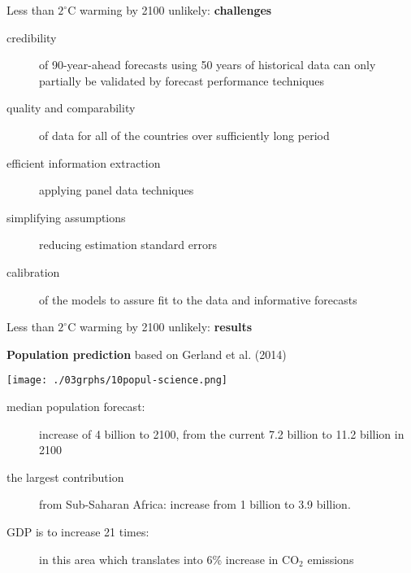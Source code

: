 \documentclass[notes,blackandwhite,mathsans,usenames,dvipsnames]{beamer}
\begin{document}
\begin{frame}{Less than $2^{\circ}$C warming by 2100 unlikely: \textbf{challenges}}

\begin{description}
\item[credibility] of 90-year-ahead forecasts using 50 years of historical data can only partially be validated by forecast performance techniques

\bigskip\item[quality and comparability] of data for all of the countries over sufficiently long period

\bigskip\item[efficient information extraction] applying panel data techniques

\bigskip\item[simplifying assumptions] reducing estimation standard errors

\bigskip\item[calibration] of the models to assure fit to the data and informative forecasts
\end{description}
\end{frame}








\begin{frame}{Less than $2^{\circ}$C warming by 2100 unlikely: \textbf{results}}

\bigskip\textbf{Population prediction} based on Gerland et al. (2014)
\begin{center}
\begin{multicols}{2}
\texttt{[image: ./03grphs/10popul-science.png]}

\begin{description}
\item[median population forecast:] increase of 4 billion to 2100, from the current 7.2 billion to 11.2 billion in 2100

\item[the largest contribution] from Sub-Saharan Africa: increase from 1 billion to 3.9 billion. 

\item[GDP is to increase 21 times:] in this area which translates into 6\% increase in CO$_2$ emissions
\end{description}
\end{multicols}
\end{center}
\end{frame}
\end{document}

